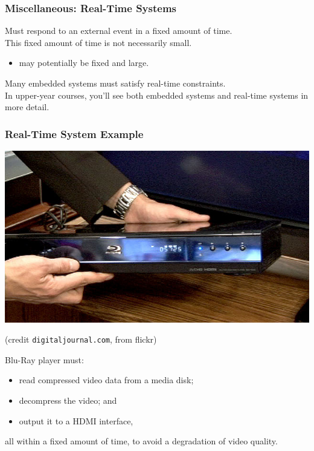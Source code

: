 \begin{frame}
\frametitle{Miscellaneous: Real-Time Systems}

\begin{changemargin}{1cm}
Must respond to an external event in a fixed amount of time. \\[1em]

This fixed amount of time is not necessarily small.
\begin{itemize}
\item may potentially be fixed and large.
\end{itemize}

Many embedded systems must satisfy real-time constraints.\\[1em]

In upper-year courses, you'll see both embedded systems and real-time
systems in more detail.
\end{changemargin}

\end{frame}

\begin{frame}
\frametitle{Real-Time System Example}

\begin{center}
\includegraphics[width=.6\textwidth]{images/bluray}
\end{center}
\hfill {\small (credit {\tt digitaljournal.com}, from flickr)}

\begin{changemargin}{1cm}
Blu-Ray player must:
\begin{itemize}
\item read compressed video data from a media disk;
\item decompress the video; and
\item output it to a HDMI interface,
\end{itemize}
all within a fixed amount of time, to avoid a degradation of video quality.
\end{changemargin}

\end{frame}





